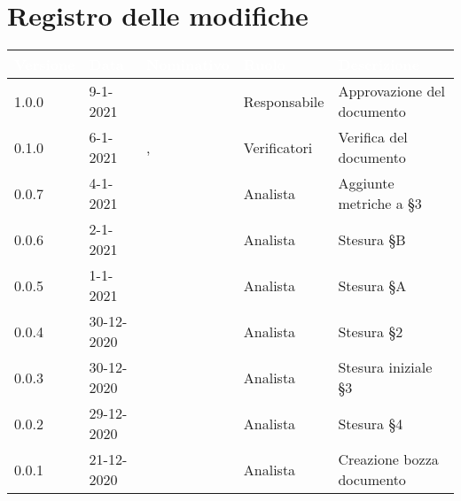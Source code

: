 \section*{Registro delle modifiche}
\setcounter{table}{-1}
{
\renewcommand{\arraystretch}{1.5}
\centering
\begin{longtable}{C{1.7cm} C{2.5cm} C{3.2cm} C{2.7cm} C{4.8cm}}
\textcolor{white}{\textbf{Versione}}&
\textcolor{white}{\textbf{Data}}&
\textcolor{white}{\textbf{Nominativo}}&
\textcolor{white}{\textbf{Ruolo}}&
\textcolor{white}{\textbf{Descrizione}}\\	
\endhead

1.0.0 & 9-1-2021 & \BM{} & Responsabile & Approvazione del documento \\
0.1.0 & 6-1-2021 & \SP{}, \BM{} & Verificatori & Verifica del documento \\
0.0.7 & 4-1-2021 & \ZM{} & Analista & Aggiunte metriche a \S 3\\
0.0.6 & 2-1-2021 & \RA{} & Analista & Stesura \S B \\
0.0.5 & 1-1-2021 & \PA{} & Analista & Stesura \S A \\
0.0.4 & 30-12-2020 & \PA{} & Analista & Stesura \S 2 \\
0.0.3 & 30-12-2020 & \ZM{} & Analista & Stesura iniziale \S 3\\
0.0.2 & 29-12-2020 & \RA{} & Analista & Stesura \S 4 \\
0.0.1 & 21-12-2020 & \ZM{} & Analista & Creazione bozza documento \\	
\end{longtable}
}
